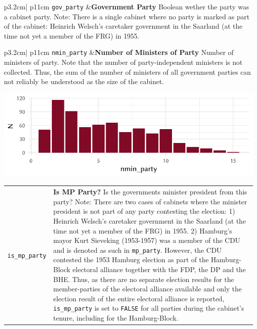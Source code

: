 \documentclass[
]{scrartcl}
\begin{document}
\begin{longtable}{p{3.2cm}| p{11cm}}
\texttt{gov\_party} &\textbf{Government Party}\newline 
Boolean wether the party was a cabinet party. Note: There is a single cabinet where no party is marked as part of the cabinet: Heinrich Welsch's caretaker government in the Saarland (at the time not yet a member of the FRG) in 1955.
\end{longtable}

\begin{longtable}{p{3.2cm}| p{11cm}}
\texttt{nmin\_party} &\textbf{Number of Ministers of Party}\newline 
Number of ministers of party. Note that the number of party-independent ministers is not collected. Thus, the sum of the number of ministers of all government parties can not reliably be understood as the size of the cabinet.



\hspace*{.25cm}
\begin{minipage}[t]{\linewidth }
\vspace{0pt}
\includegraphics[width = \linewidth]{cbfiles/nminpartyplot.pdf}
\end{minipage}



\end{longtable}

\begin{longtable}{p{3.2cm}| p{11cm}}
\texttt{is\_mp\_party} &\textbf{Is MP Party?}\newline 
Is the governments minister president from this party? Note: There are two cases of cabinets where the minister president is not part of any party contesting the election: 1) Heinrich Welsch's caretaker government in the Saarland (at the time not yet a member of the FRG) in 1955. 2) Hamburg's mayor Kurt Sieveking (1953-1957) was a member of the CDU and is denoted as such in \texttt{mp\_party}. However, the CDU contested the 1953 Hamburg election as part of the Hamburg-Block electoral alliance together with the FDP, the DP and the BHE. Thus, as there are no separate election results for the member-parties of the electoral alliance available and only the election result of the entire electoral alliance is reported, \texttt{is\_mp\_party} is set to \texttt{FALSE} for all parties during the cabinet's tenure, including for the Hamburg-Block.
\end{longtable}
\end{document}
